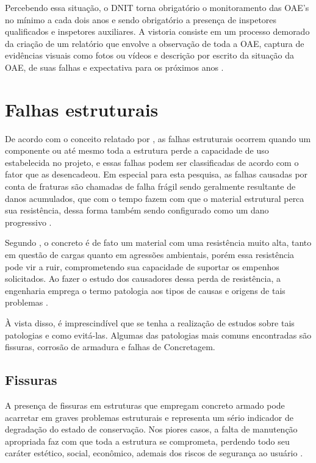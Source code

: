 Percebendo essa situação, o DNIT torna obrigatório o monitoramento das OAE's no mínimo a cada dois anos e sendo obrigatório a presença de inspetores qualificados e inspetores auxiliares.
A vistoria consiste em um processo demorado da criação de um relatório que envolve a observação de toda a OAE, captura de evidências visuais como fotos ou vídeos e descrição por escrito da situação da OAE, de suas falhas e expectativa para os próximos anos \cite{dnit2004}.

\section{Falhas estruturais}

De acordo com o conceito relatado por , as falhas estruturais ocorrem quando um componente ou até mesmo toda a estrutura perde a capacidade de uso estabelecida no projeto, e essas falhas podem ser classificadas de acordo com o fator que as desencadeou.
Em especial para esta pesquisa, as falhas causadas por conta de fraturas são chamadas de falha frágil sendo geralmente resultante de danos acumulados, que com o tempo fazem com que o material estrutural perca sua resistência, dessa forma também sendo configurado como um dano progressivo \cite{anneLink2016}.

 Segundo , o concreto é de fato um material com uma resistência muito alta, tanto em questão de cargas quanto em agressões ambientais, porém essa resistência pode vir a ruir, comprometendo sua capacidade de suportar os empenhos solicitados. 
 Ao fazer o estudo dos causadores dessa perda de resistência, a engenharia emprega o termo patologia aos tipos de causas e origens de tais problemas \cite{cremonini1988incidencia}.
 
 À vista disso, é imprescindível  que se tenha a realização de estudos sobre tais patologias e como evitá-las. Algumas das patologias mais comuns \cite{statera} encontradas são fissuras, corrosão de armadura e falhas de Concretagem.

\subsection{Fissuras}

A presença de fissuras em estruturas que empregam concreto armado pode acarretar em graves problemas estruturais e representa um sério indicador de degradação do estado de conservação.
Nos piores casos, a falta de manutenção apropriada faz com que toda a estrutura se comprometa, perdendo todo seu caráter estético, social, econômico, ademais dos riscos de segurança ao usuário \cite{santos2014patologia}.

